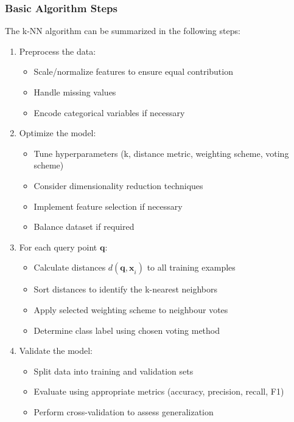 \subsubsection*{Basic Algorithm Steps}
The k-NN algorithm can be summarized in the following steps:
\begin{enumerate}
    \item Preprocess the data:
        \begin{itemize}
            \item Scale/normalize features to ensure equal contribution
            \item Handle missing values
            \item Encode categorical variables if necessary
        \end{itemize}
    \item Optimize the model:
        \begin{itemize}
            \item Tune hyperparameters (k, distance metric, weighting scheme, voting scheme)
            \item Consider dimensionality reduction techniques
            \item Implement feature selection if necessary
            \item Balance dataset if required
        \end{itemize}
    \item For each query point \(\mathbf{q}\):
        \begin{itemize}
            \item Calculate distances \(d(\mathbf{q,x}_i)\) to all training examples
            \item Sort distances to identify the k-nearest neighbors
            \item Apply selected weighting scheme to neighbour votes
            \item Determine class label using chosen voting method
        \end{itemize}
    \item Validate the model:
        \begin{itemize}
            \item Split data into training and validation sets
            \item Evaluate using appropriate metrics (accuracy, precision, recall, F1)
            \item Perform cross-validation to assess generalization
        \end{itemize}
\end{enumerate}

